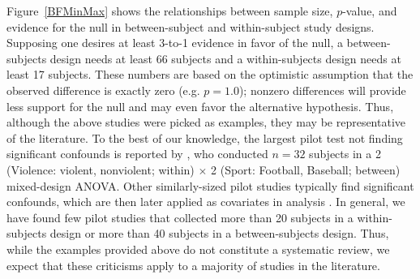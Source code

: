 \documentclass[man]{apa6}
\begin{document}
Figure~\ref{BFMinMax} shows the relationships between sample size, $p$-value, and evidence for the null in between-subject and within-subject study designs. Supposing one desires at least 3-to-1 evidence in favor of the null, a between-subjects design needs at least 66 subjects and a within-subjects design needs at least 17 subjects. These numbers are based on the optimistic assumption that the observed difference is exactly zero (e.g. $p = 1.0$); nonzero differences will provide less support for the null and may even favor the alternative hypothesis. Thus, although the above studies were picked as examples, they may be representative of the literature. To the best of our knowledge, the largest pilot test not finding significant confounds is reported by \citet{Anderson:Carnagey:2009}, who conducted $n = 32$ subjects in a 2 (Violence: violent, nonviolent; within) $\times$ 2 (Sport: Football, Baseball; between) mixed-design ANOVA. Other similarly-sized pilot studies typically find significant confounds, which are then later applied as covariates in analysis \citep[e.g.,][]{Anderson:Dill:2000, Gitter:etal:2013}.
In general, we have found few pilot studies that collected more than 20 subjects in a within-subjects design or more than 40 subjects in a between-subjects design. Thus, while the examples provided above do not constitute a systematic review, we expect that these criticisms apply to a majority of studies in the literature.


\end{document}
